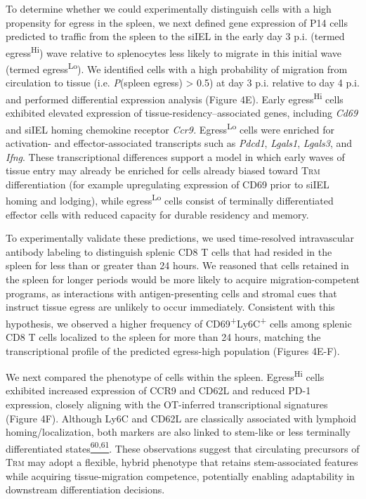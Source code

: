To determine whether we could experimentally distinguish cells with a
high propensity for egress in the spleen, we next defined gene
expression of P14 cells predicted to traffic from the spleen to the
siIEL in the early day 3 p.i. (termed egress\textsuperscript{Hi}) wave
relative to splenocytes less likely to migrate in this initial wave
(termed egress\textsuperscript{Lo}). We identified cells with a high
probability of migration from circulation to tissue (i.e.
\emph{P}(spleen egress) \textgreater{} 0.5) at day 3 p.i. relative to
day 4 p.i. and performed differential expression analysis (Figure 4E).
Early egress\textsuperscript{Hi} cells exhibited elevated expression of
tissue-residency--associated genes, including \emph{Cd69} and siIEL
homing chemokine receptor \emph{Ccr9.} Egress\textsuperscript{Lo} cells
were enriched for activation- and effector-associated transcripts such
as \emph{Pdcd1}, \emph{Lgals1}, \emph{Lgals3}, and \emph{Ifng}. These
transcriptional differences support a model in which early waves of
tissue entry may already be enriched for cells already biased toward
T\textsc{rm} differentiation (for example upregulating expression of
CD69 prior to siIEL homing and lodging), while
egress\textsuperscript{Lo} cells consist of terminally differentiated
effector cells with reduced capacity for durable residency and memory.

To experimentally validate these predictions, we used time-resolved
intravascular antibody labeling to distinguish splenic CD8 T cells that
had resided in the spleen for less than or greater than 24 hours. We
reasoned that cells retained in the spleen for longer periods would be
more likely to acquire migration-competent programs, as interactions
with antigen-presenting cells and stromal cues that instruct tissue
egress are unlikely to occur immediately. Consistent with this
hypothesis, we observed a higher frequency of
CD69\textsuperscript{+}Ly6C\textsuperscript{+} cells among splenic CD8 T
cells localized to the spleen for more than 24 hours, matching the
transcriptional profile of the predicted egress-high population (Figures
4E-F).

We next compared the phenotype of cells within the spleen.
Egress\textsuperscript{Hi} cells exhibited increased expression of CCR9
and CD62L and reduced PD-1 expression, closely aligning with the
OT-inferred transcriptional signatures (Figure 4F). Although Ly6C and
CD62L are classically associated with lymphoid homing/localization, both
markers are also linked to stem-like or less terminally differentiated
states\href{https://sciwheel.com/work/citation?ids=10765999,9105104\&pre=\&pre=\&suf=\&suf=\&sa=0,0\&dbf=0\&dbf=0}{\textsuperscript{60,61}}.
These observations suggest that circulating precursors of T\textsc{rm}
may adopt a flexible, hybrid phenotype that retains stem-associated
features while acquiring tissue-migration competence, potentially
enabling adaptability in downstream differentiation decisions.

